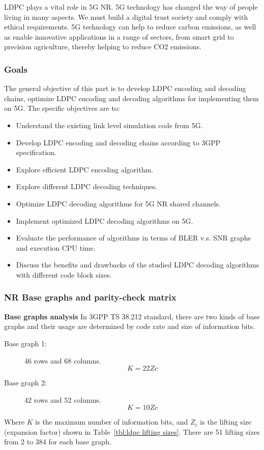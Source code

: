 LDPC plays a vital role in 5G NR. 5G technology has changed the way of people living in many aspects. We must build a digital trust society and comply with ethical requirements.
5G technology can help to reduce carbon emissions, as well as enable innovative applications in a range of sectors, from smart grid to precision agriculture, thereby helping to reduce CO2 emissions.

\subsubsection{Goals} 
The general objective of this part is to develop LDPC encoding and decoding chains, optimize LDPC encoding and decoding algorithms for implementing them on 5G. The specific objectives are to:
\begin{itemize}
    \item Understand the existing link level simulation code from 5G.
    \item Develop LDPC encoding and decoding chains according to 3GPP specification.
    \item Explore efficient LDPC encoding algorithm.
    \item Explore different LDPC decoding techniques.
    \item Optimize LDPC decoding algorithms for 5G NR shared channels.
    \item Implement optimized LDPC decoding algorithms on 5G.
    \item Evaluate the performance of algorithms in terms of BLER v.s. SNR graphs and execution CPU time.
    \item Discuss the benefits and drawbacks of the studied LDPC decoding algorithms with different code block sizes.
\end{itemize}

\subsubsection{NR Base graphs and parity-check matrix}
\textbf{Base graphs analysis}
In 3GPP TS 38.212 standard, there are two kinds of base graphs and their usage are determined by code rate and size of information bits. 
\begin{description}
    \item[Base graph 1:] 46 rows and 68 columns.
    \[K = 22Zc\]
    \item[Base graph 2:] 42 rows and 52 columns.
    \[K = 10Zc\]
\end{description}
Where $K$ is the maximum number of information bits, and $Z_c$ is the lifting size (expansion factor) shown in Table~\ref{tbl:ldpc lifting sizes}. There are 51 lifting sizes from 2 to 384 for each base graph.

